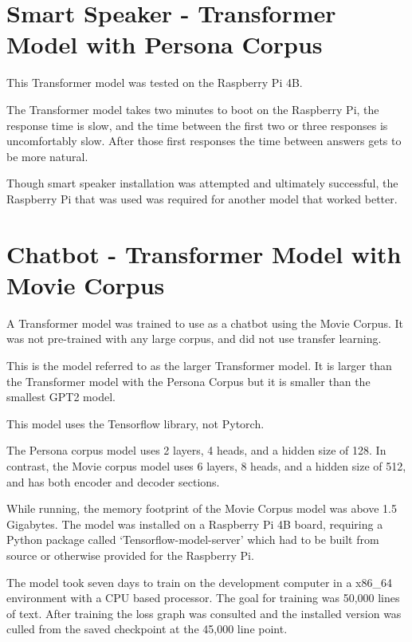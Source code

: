 \section{Smart Speaker - Transformer Model with Persona Corpus}

This Transformer model was tested on the Raspberry Pi 4B. 

The Transformer model takes two minutes to boot on the Raspberry Pi, the response time is slow, and the time between the first two or three responses is uncomfortably slow. After those first responses the time between answers gets to be more natural.

Though smart speaker installation was attempted and ultimately successful, the Raspberry Pi that was used was required for another model that worked better. %

\section{Chatbot - Transformer Model with Movie Corpus}

\label{transformer-movie-corpus}
A Transformer model was trained to use as a chatbot using the Movie Corpus. It was not pre-trained with any large corpus, and did not use transfer learning. 

This is the model referred to as the larger Transformer model. It is larger than the Transformer model with the Persona Corpus but it is smaller than the smallest GPT2 model.

This model uses the Tensorflow library, not Pytorch. 

The Persona corpus model uses 2 layers, 4 heads, and a hidden size of 128. In contrast, the Movie corpus model uses 6 layers, 8 heads, and a hidden size of 512, and has both encoder and decoder sections.

While running, the memory footprint of the Movie Corpus model was above 1.5 Gigabytes. The model was installed on a Raspberry Pi 4B board, requiring a Python package called `Tensorflow-model-server' which had to be built from source or otherwise provided for the Raspberry Pi. 

The model took seven days to train on the development computer in a x86\_64 environment with a CPU based processor. The goal for training was 50,000 lines of text. After training the loss graph was consulted and the installed version was culled from the saved checkpoint at the 45,000 line point.


